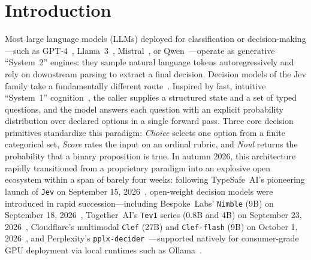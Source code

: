 \documentclass[10pt]{article}
\begin{document}
\section{Introduction}
Most large language models (LLMs) deployed for classification or decision-making---such as GPT-4~\cite{achiam2023gpt4}, Llama~3~\cite{dubey2024llama3}, Mistral~\cite{jiang2023mistral}, or Qwen~\cite{yang2024qwen2}---operate as generative ``System~2'' engines: they sample natural language tokens autoregressively and rely on downstream parsing to extract a final decision.
Decision models of the Jev family take a fundamentally different route~\cite{typesafe2026jev,systemone2026api}.
Inspired by fast, intuitive ``System~1'' cognition~\cite{kahneman2011thinking}, the caller supplies a structured state and a set of typed questions, and the model answers each question with an explicit probability distribution over declared options in a single forward pass.
Three core decision primitives standardize this paradigm:
\emph{Choice} selects one option from a finite categorical set, \emph{Score} rates the input on an ordinal rubric, and \emph{Noul} returns the probability that a binary proposition is true.
In autumn 2026, this architecture rapidly transitioned from a proprietary paradigm into an explosive open ecosystem within a span of barely four weeks: following TypeSafe~AI's pioneering launch of \texttt{Jev} on September 15, 2026~\cite{typesafe2026jev}, open-weight decision models were introduced in rapid succession---including Bespoke~Labs' \texttt{Nimble} (9B) on September 18, 2026~\cite{bespoke2026nimble}, Together~AI's \texttt{Tev1} series (0.8B and 4B) on September 23, 2026~\cite{ollama2026tev1}, Cloudflare's multimodal \texttt{Clef} (27B) and \texttt{Clef-flash} (9B) on October 1, 2026~\cite{cloudflare2026clef}, and Perplexity's \texttt{pplx-decider}~\cite{perplexity2026decider}---supported natively for consumer-grade GPU deployment via local runtimes such as Ollama~\cite{ollama2026decision}.
\end{document}
